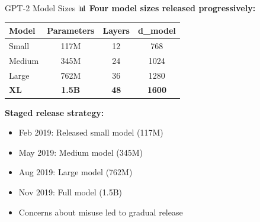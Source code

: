 \documentclass[aspectratio=169]{beamer}
\begin{document}
\begin{frame}{GPT-2 Model Sizes 📊}
    \textbf{Four model sizes released progressively:}

    \vspace{0.3cm}

    \begin{table}
        \begin{tabular}{lccc}
            \toprule
            \textbf{Model} & \textbf{Parameters} & \textbf{Layers} & \textbf{d\_model} \\
            \midrule
            Small & 117M & 12 & 768 \\
            Medium & 345M & 24 & 1024 \\
            Large & 762M & 36 & 1280 \\
            \textbf{XL} & \textbf{1.5B} & \textbf{48} & \textbf{1600} \\
            \bottomrule
        \end{tabular}
    \end{table}

    \vspace{0.3cm}

    \textbf{Staged release strategy:}
    \begin{itemize}\setlength{\itemsep}{0pt}
        \item Feb 2019: Released small model (117M)
        \item May 2019: Medium model (345M)
        \item Aug 2019: Large model (762M)
        \item Nov 2019: Full model (1.5B)
        \item Concerns about misuse led to gradual release
    \end{itemize}
\end{frame}
\end{document}
